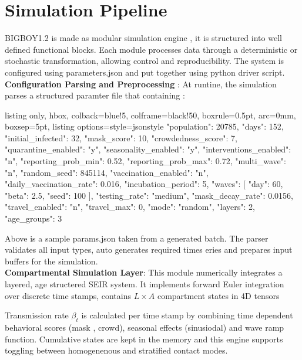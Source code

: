 \documentclass[11pt,a4paper]{article}
\theoremstyle{remark}\newtheorem{remark}{Remark}
\begin{document}
\section{Simulation Pipeline}
BIGBOY1.2 is made as modular simulation engine , it is structured into well defined functional blocks. Each module processes data through a deterministic or stochastic transformation, allowing control and reproducibility. The system is configured using parameters.json and put together using python driver script. \\
\textbf{Configuration Parsing and Preprocessing} : At runtine, the simulation parses a structured paramter file that containing : 
\begin{center}
\begin{tcblisting}{
  listing only,
  hbox,
  colback=blue!5,
  colframe=black!50,
  boxrule=0.5pt,
  arc=0mm,
  boxsep=5pt,
  listing options={style=jsonstyle}
}
{
    "population": 20785,
    "days": 152,
    "initial_infected": 32,
    "mask_score": 10,
    "crowdedness_score": 7,
    "quarantine_enabled": "y",
    "seasonality_enabled": "y",
    "interventions_enabled": "n",
    "reporting_prob_min": 0.52,
    "reporting_prob_max": 0.72,
    "multi_wave": "n",
    "random_seed": 845114,
    "vaccination_enabled": "n",
    "daily_vaccination_rate": 0.016,
    "incubation_period": 5,
    "waves": [
        {
            "day": 60,
            "beta": 2.5,
            "seed": 100
        }
    ],
    "testing_rate": "medium",
    "mask_decay_rate": 0.0156,
    "travel_enabled": "n",
    "travel_max": 0,
    "mode": "random",
    "layers": 2,
    "age_groups": 3
}
\end{tcblisting}
\end{center}
Above is a sample params.json taken from a generated batch. The parser validates all input types, auto generates required times eries and prepares input buffers for the simulation. \\
\textbf{Compartmental Simulation Layer}: This module numerically integrates a layered, age structered SEIR system. It implements forward Euler integration over discrete time stamps, contains $L \times A$ compartment states in 4D tensors
\begin{center}
\end{center}
Transmission rate $\beta_t$ is calculated per time stamp by combining time dependent behavioral scores (mask , crowd), seasonal effects (sinusiodal) and wave ramp function. Cumulative states are kept in the memory and this engine supports toggling between homogenenous and stratified contact modes.\\
\end{document}
